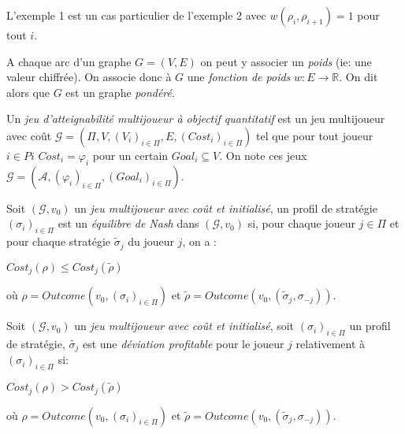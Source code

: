 \begin{rem}
	L'exemple 1 est un cas particulier de l'exemple 2 avec $w(\rho_{i},\rho_{i+1}) = 1$ pour tout $i$.
\end{rem}

\begin{defi}
	\label{def:fonctionPoids}
	A chaque arc d'un graphe $G = (V,E)$ on peut y associer un \textit{poids} (ie: une valeur chiffrée). On associe donc à $G$ une \textit{fonction de poids}  $w : E \rightarrow \mathbb{R}$. On dit alors que $G$ est un graphe \textit{pondéré}.
\end{defi}



\begin{defi}
	
	Un \textit{jeu d'atteignabilité multijoueur à objectif quantitatif} est un jeu multijoueur avec coût $\mathcal{G} = (\Pi ,V ,(V_{i})_{i \in \Pi} ,E ,(Cost_{i})_{i \in \Pi})$ tel que pour tout joueur $i \in Pi$ $Cost_{i} = \varphi _{i}$ pour un certain $Goal _{i} \subseteq V$.
	On note ces jeux $\mathcal{G} = (\mathcal{A},(\varphi _{i})_{i\in \Pi},(Goal_{i})_{i \in \Pi})$.
\end{defi}
	










\begin{defi}
	
	Soit $(\mathcal{G}, v_{0})$ un \textit{jeu multijoueur avec coût et initialisé}, un profil de stratégie $(\sigma _{i})_{i \in \Pi}$ est un \textit{équilibre de Nash} dans $(\mathcal{G}, v_{0})$ si, pour chaque joueur $j \in \Pi$ et pour chaque stratégie $\tilde{\sigma}_{j}$ du joueur $j$, on a :
	\begin{center}$ Cost_{j}(\rho) \leq Cost_{j}(\tilde{\rho})$ \end{center}
	où $\rho = Outcome(v_{0},(\sigma _{i})_{i \in \Pi})$ et $\tilde{\rho} = Outcome(v_{0}, (\tilde{\sigma} _{j} ,\sigma _{-j}))$.
\end{defi}	



\begin{defi}
	
	Soit $(\mathcal{G}, v_{0})$ un \textit{jeu multijoueur avec coût et initialisé}, soit $(\sigma _{i})_{i \in \Pi}$ un profil de stratégie, $\tilde{\sigma _{j}}$ est une \textit{déviation profitable} pour le joueur $j$ relativement à $(\sigma _{i})_{i \in \Pi}$ si:
	\begin{center} $ Cost_{j}(\rho) > Cost_{j}(\tilde{\rho})$ \end{center}
	où $\rho = Outcome(v_{0},(\sigma _{i})_{i \in \Pi})$ et $\tilde{\rho} = Outcome(v_{0}, (\tilde{\sigma} _{j} ,\sigma _{-j}))$. 
\end{defi}

